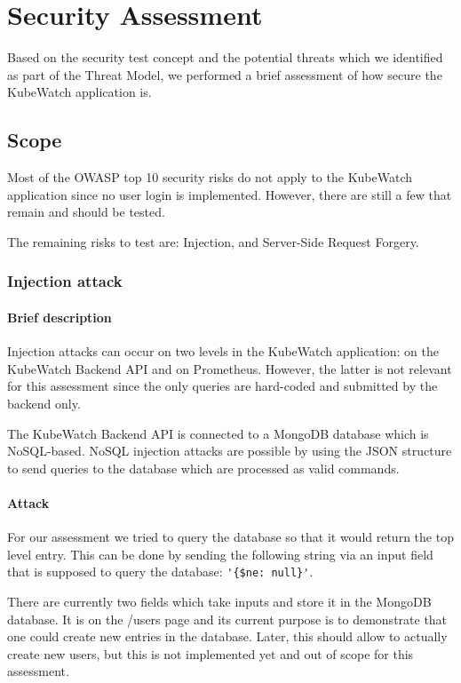 \chapter{Security Assessment}

Based on the security test concept and the potential threats which we identified as part of the Threat Model, we performed a brief assessment of how secure the KubeWatch application is.

\section{Scope}

Most of the OWASP top 10 security risks do not apply to the KubeWatch application since no user login is implemented. However, there are still a few that remain and should be tested.

The remaining risks to test are: Injection, and Server-Side Request Forgery. 

\subsection{Injection attack}
\subsubsection{Brief description}
Injection attacks can occur on two levels in the KubeWatch application: on the KubeWatch Backend API and on Prometheus. However, the latter is not relevant for this assessment since the only queries are hard-coded and submitted by the backend only.

The KubeWatch Backend API is connected to a MongoDB database which is NoSQL-based. NoSQL injection attacks are possible by using the JSON structure to send queries to the database which are processed as valid commands.

\subsubsection{Attack}
For our assessment we tried to query the database so that it would return the top level entry. This can be done by sending the following string via an input field that is supposed to query the database: \lstinline "'{$ne: null}'".

There are currently two fields which take inputs and store it in the MongoDB database. It is on the /users page and its current purpose is to demonstrate that one could create new entries in the database. Later, this should allow to actually create new users, but this is not implemented yet and out of scope for this assessment.

